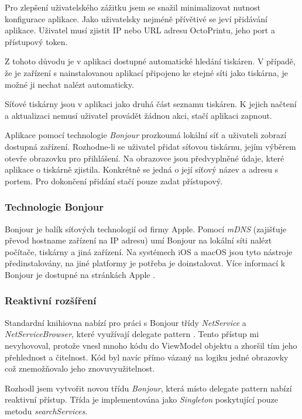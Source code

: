 Pro zlepšení uživatelského zážitku jsem se snažil minimalizovat nutnost konfigurace aplikace.
Jako uživatelsky nejméně přívětivé se jeví přidávání aplikace.
Uživatel musí zjistit IP nebo URL adresu OctoPrintu, jeho port a přístupový token.

Z tohoto důvodu je v aplikaci dostupné automatické hledání tiskáren.
V případě, že je zařízení s nainstalovanou aplikací připojeno ke stejné síti jako tiskárna, je možné ji nechat nalézt automaticky.

Síťové tiskárny jsou v aplikaci jako druhá část seznamu tiskáren.
K jejich načtení a aktualizaci nemusí uživatel provádět žádnou akci, stačí aplikaci zapnout.

Aplikace pomocí technologie \textit{Bonjour} prozkoumá lokální síť a uživateli zobrazí dostupná zařízení.
Rozhodne-li se uživatel přidat síťovou tiskárnu, jejím výběrem otevře obrazovku pro přihlášení.
Na obrazovce jsou předvyplněné údaje, které aplikace o tiskárně zjistila.
Konkrétně se jedná o její síťový název a adresu s portem.
Pro dokončení přidání stačí pouze zadat přístupový.

\subsubsection*{Technologie Bonjour}

Bonjour je balík síťových technologií od firmy Apple.
Pomocí \textit{mDNS} (zajišťuje převod hostname zařízení na IP adresu) umí Bonjour na lokální síti nalézt počítače, tiskárny a jiná zařízení.
Na systémech iOS a macOS jsou tyto nástroje předinstalovány, na jiné platformy je potřeba je doinstalovat.
Více informací k Bonjour je dostupné na stránkách Apple \cite{apple-bonjour}.

\subsubsection*{Reaktivní rozšíření}

Standardní knihiovna nabízí pro práci s Bonjour třídy \textit{NetService} a \textit{NetServiceBrowser}, které využívají delegate pattern \cite{apple-netservicebrowser}.
Tento přístup mi nevyhovoval, protože vnesl mnoho kódu do ViewModel objektu a zhoršil tím jeho přehlednost a čitelnost.
Kód byl navíc přímo vázaný na logiku jedné obrazovky což znemožňovalo jeho znovuvyužitelnost.

Rozhodl jsem vytvořit novou třídu \textit{Bonjour}, která místo delegate pattern nabízí reaktivní přístup.
Třída je implementována jako \textit{Singleton} \cite{thatthinginswift-singletons} poskytující pouze metodu \textit{searchServices}.

